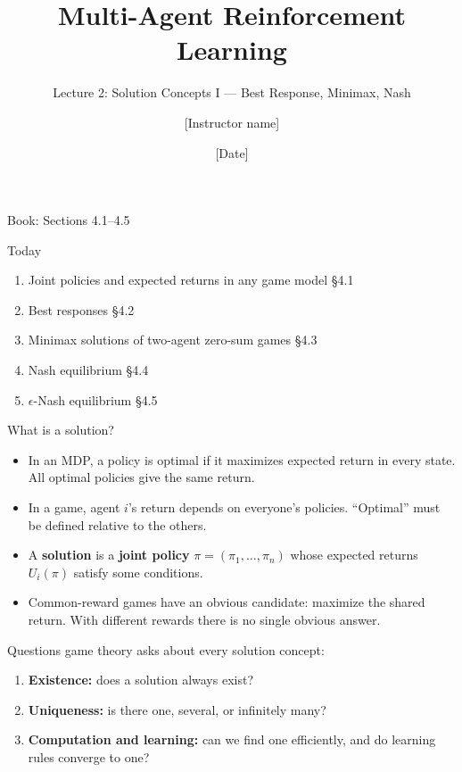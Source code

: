 \documentclass[aspectratio=169,11pt]{beamer}
\title{Multi-Agent Reinforcement Learning}
\subtitle{Lecture 2: Solution Concepts I --- Best Response, Minimax, Nash}
\author{[Instructor name]}
\institute{[Course number]}
\date{[Date]}
\begin{document}
\begin{frame}
  \titlepage
  \centering\small Book: Sections 4.1--4.5
\end{frame}

\begin{frame}{Today}
  \begin{enumerate}
    \item Joint policies and expected returns in any game model \hfill \S4.1
    \item Best responses \hfill \S4.2
    \item Minimax solutions of two-agent zero-sum games \hfill \S4.3
    \item Nash equilibrium \hfill \S4.4
    \item $\epsilon$-Nash equilibrium \hfill \S4.5
  \end{enumerate}
  \bigskip
  \centering
  
\end{frame}

\begin{frame}{What is a solution?}
  \begin{itemize}
    \item In an MDP, a policy is optimal if it maximizes expected return in every state. All optimal policies give the same return.
    \item In a game, agent $i$'s return depends on everyone's policies. ``Optimal'' must be defined relative to the others.
    \item A \textbf{solution} is a \textbf{joint policy} $\pi = (\pi_1, \dots, \pi_n)$ whose expected returns $U_i(\pi)$ satisfy some conditions.
    \item Common-reward games have an obvious candidate: maximize the shared return. With different rewards there is no single obvious answer.
  \end{itemize}
  \bigskip
  Questions game theory asks about every solution concept:
  \begin{enumerate}
    \item \textbf{Existence:} does a solution always exist?
    \item \textbf{Uniqueness:} is there one, several, or infinitely many?
    \item \textbf{Computation and learning:} can we find one efficiently, and do learning rules converge to one?
  \end{enumerate}
\end{frame}
\end{document}
